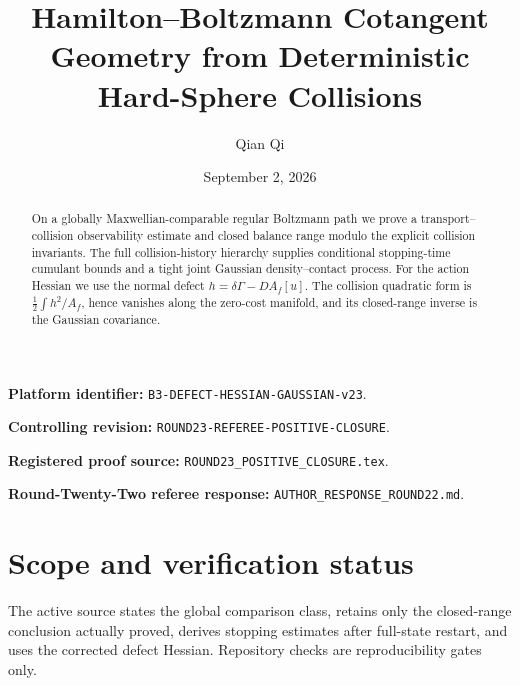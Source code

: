 \documentclass[11pt,reqno]{amsart}
\title[Hamilton--Boltzmann cotangent geometry]{Hamilton--Boltzmann Cotangent Geometry from Deterministic Hard-Sphere Collisions}
\author{Qian Qi}
\date{September 2, 2026}
\theoremstyle{definition}
\theoremstyle{remark}
\begin{document}
\raggedbottom
\begin{abstract}
On a globally Maxwellian-comparable regular Boltzmann path we prove a
transport--collision observability estimate and closed balance range modulo
the explicit collision invariants.  The full collision-history hierarchy
supplies conditional stopping-time cumulant bounds and a tight joint
Gaussian density--contact process.  For the action Hessian we use the normal
defect $h=\delta\Gamma-D A_f[u]$.  The collision quadratic form is
$\frac12\int h^2/A_f$, hence vanishes along the zero-cost manifold, and its
closed-range inverse is the Gaussian covariance.
\end{abstract}
\maketitle
\noindent\textbf{Platform identifier:} \texttt{B3-DEFECT-HESSIAN-GAUSSIAN-v23}.\par
\noindent\textbf{Controlling revision:} \texttt{ROUND23-REFEREE-POSITIVE-CLOSURE}.\par
\noindent\textbf{Registered proof source:} \texttt{ROUND23\_POSITIVE\_CLOSURE.tex}.\par
\noindent\textbf{Round-Twenty-Two referee response:} \texttt{AUTHOR\_RESPONSE\_ROUND22.md}.\par
\tableofcontents

\section*{Scope and verification status}
The active source states the global comparison class, retains only the
closed-range conclusion actually proved, derives stopping estimates after
full-state restart, and uses the corrected defect Hessian. Repository checks
are reproducibility gates only.
\printbibliography
\end{document}
